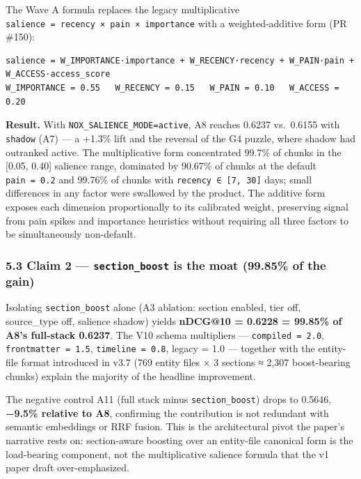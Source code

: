 \documentclass[
]{article}
\begin{document}
The Wave A formula replaces the legacy multiplicative
\texttt{salience\ =\ recency\ ×\ pain\ ×\ importance} with a
weighted-additive form (PR \#150):

\begin{verbatim}
salience = W_IMPORTANCE·importance + W_RECENCY·recency + W_PAIN·pain + W_ACCESS·access_score
W_IMPORTANCE = 0.55   W_RECENCY = 0.15   W_PAIN = 0.10   W_ACCESS = 0.20
\end{verbatim}

\textbf{Result.} With \texttt{NOX\_SALIENCE\_MODE=active}, A8 reaches
0.6237 vs.~0.6155 with \texttt{shadow} (A7) --- a +1.3\% lift and the
reversal of the G4 puzzle, where shadow had outranked active. The
multiplicative form concentrated 99.7\% of chunks in the {[}0.05,
0.40{]} salience range, dominated by 90.67\% of chunks at the default
\texttt{pain\ =\ 0.2} and 99.76\% of chunks with
\texttt{recency\ ∈\ {[}7,\ 30{]}} days; small differences in any factor
were swallowed by the product. The additive form exposes each dimension
proportionally to its calibrated weight, preserving signal from pain
spikes and importance heuristics without requiring all three factors to
be simultaneously non-default.

\subsubsection{\texorpdfstring{5.3 Claim 2 --- \texttt{section\_boost}
is the moat (99.85\% of the
gain)}{5.3 Claim 2 --- section\_boost is the moat (99.85\% of the gain)}}\label{claim-2-section_boost-is-the-moat-99.85-of-the-gain}

Isolating \texttt{section\_boost} alone (A3 ablation: section enabled,
tier off, source\_type off, salience shadow) yields \textbf{nDCG@10 =
0.6228 = 99.85\% of A8's full-stack 0.6237}. The V10 schema multipliers
--- \texttt{compiled\ =\ 2.0}, \texttt{frontmatter\ =\ 1.5},
\texttt{timeline\ =\ 0.8}, legacy = 1.0 --- together with the
entity-file format introduced in v3.7 (769 entity files × 3 sections ≈
2,307 boost-bearing chunks) explain the majority of the headline
improvement.

The negative control A11 (full stack minus \texttt{section\_boost})
drops to 0.5646, \textbf{−9.5\% relative to A8}, confirming the
contribution is not redundant with semantic embeddings or RRF fusion.
This is the architectural pivot the paper's narrative rests on:
section-aware boosting over an entity-file canonical form is the
load-bearing component, not the multiplicative salience formula that the
v1 paper draft over-emphasized.
\end{document}
